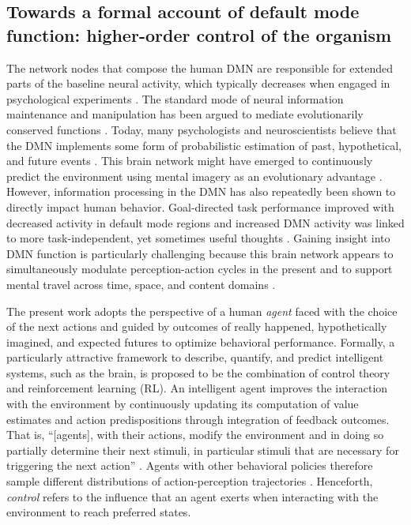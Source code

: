 \documentclass[10pt,letterpaper]{article}
\begin{document}
\subsection{Towards a formal account of default mode function: higher-order control of the organism}
The network nodes that compose the human DMN
are responsible for extended parts of the baseline neural activity,
which typically decreases when engaged in psychological experiments
\citep{raichle_baseline}.
The standard mode of
neural information maintenance and manipulation has
been argued to mediate evolutionarily conserved functions
\citep{brown1914nature, binder1999conceptual, buzsaki2006rhythms}.
Today, many psychologists and neuroscientists believe that
the DMN implements some form of
probabilistic estimation of past, hypothetical, and
future events
\citep{fox2005, hassabis2007patients, schacter2007remembering, binder2009,
randy2008, spreng2009common}.
This brain network
might have emerged to continuously predict the environment using
mental imagery as an evolutionary advantage \citep{suddendorf2007evolution}.
%
However, information processing in the DMN has also repeatedly
been shown to directly impact human behavior. Goal-directed task performance
improved with decreased activity in default mode regions \citep{weiss2006}
and increased DMN activity was linked to more task-independent,
yet sometimes useful thoughts
\citep{mason2007, seli2016mind}.
%
Gaining insight into DMN function is
particularly challenging because
this brain network appears to
simultaneously modulate perception-action cycles in the present
and to support mental travel
across time, space, and content domains
\citep{boyer2008evolutionary}.


The present work adopts the perspective of
a human \textit{agent} faced with the choice of the next actions
and guided by outcomes
of really happened, hypothetically imagined, and
expected futures to optimize behavioral performance.
Formally, a particularly attractive framework
to describe, quantify, and predict intelligent systems, such as the brain,
is proposed to be the combination of control theory and
reinforcement learning (RL).
An intelligent agent improves the interaction with the environment
by continuously updating its computation of value estimates and action predispositions
through integration of feedback outcomes.
That is, ``[agents], with their actions, modify the environment and in doing so partially determine their next stimuli, in particular stimuli that are necessary for triggering the next action''
\citep{pezzulo2011grounding}.
Agents with other behavioral policies therefore sample different
distributions of action-perception trajectories \citep{ghavamzadeh2015bayesian}.
Henceforth,
\textit{control} refers to the influence that an agent exerts when interacting
with the environment to reach preferred states.
\end{document}
